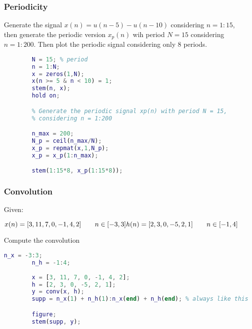     \subsubsection{Periodicity}
    Generate the signal $x(n)=u(n-5)-u(n-10)$ considering $n=1:15$, then generate the periodic version $x_p(n)$ wih period $N=15$ considering $n=1:200$. Then plot the periodic signal considering only 8 periods.
    \begin{lstlisting}[language=Matlab, escapeinside=`']
        % generate signal x(n)
        N = 15; % period
        n = 1:N;
        x = zeros(1,N);
        x(n >= 5 & n < 10) = 1;
        stem(n, x);
        hold on;

        % Generate the periodic signal xp(n) with period N = 15,
        % considering n = 1:200

        n_max = 200;
        N_p = ceil(n_max/N);
        x_p = repmat(x,1,N_p);
        x_p = x_p(1:n_max);

        stem(1:15*8, x_p(1:15*8));
    \end{lstlisting}

    \subsubsection{Convolution}
    Given:

    $
    x(n)=[3,11,7,0,-1,4,2]\qquad n\in[-3,3]\\
    h(n)=[2,3,0,-5,2,1]\qquad n\in[-1,4]
    $

    Compute the convolution
    \begin{lstlisting}[language=Matlab, escapeinside=`']
        n_x = -3:3;
        n_h = -1:4;
        
        x = [3, 11, 7, 0, -1, 4, 2];
        h = [2, 3, 0, -5, 2, 1];
        y = conv(x, h);
        supp = n_x(1) + n_h(1):n_x(end) + n_h(end); % always like this

        figure;
        stem(supp, y);
    \end{lstlisting}

